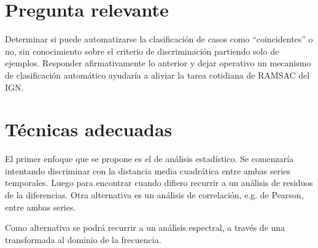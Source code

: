 \documentclass[11pt,spanish,a4paper]{article}
\begin{document}






\section*{Pregunta relevante}
Determinar si puede automatizarse la clasificación de casos como ``coincidentes'' o no, sin conocimiento sobre el criterio de discriminación partiendo solo de ejemplos.
Responder afirmativamente lo anterior y dejar operativo un mecanismo de clasificación automático ayudaría a aliviar la tarea cotidiana de RAMSAC del IGN.


\section*{Técnicas adecuadas}
El primer enfoque que se propone es el de análisis estadístico.
Se comenzaría intentando discriminar con la distancia media cuadrática entre ambas series temporales.
Luego para encontrar cuando difiero recurrir a un análisis de residuos de la diferencias.
Otra alternativa es un análisis de correlación, e.g. de Pearson, entre ambas series.

Como alternativa se podrá recurrir a un análisis espectral, a través de una transformada al dominio de la frecuencia.



\printbibliography[title= Referencias, heading=bibintoc]
\end{document}
